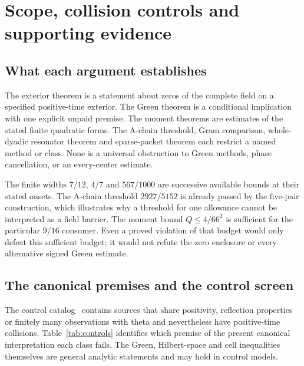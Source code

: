 \section{Scope, collision controls and supporting evidence}\label{sec:evidence}

\subsection{What each argument establishes}

The exterior theorem is a statement about zeros of the complete field
on a specified positive-time exterior. The Green theorem is a conditional
implication with one explicit unpaid premise. The moment theorems are
estimates of the stated finite quadratic forms. The A-chain threshold,
Gram comparison, whole-dyadic resonator theorem and sparse-packet theorem
each restrict a named method or class. None is a universal obstruction
to Green methods, phase cancellation, or an every-center estimate.

The finite widths $7/12$, $4/7$ and $567/1000$ are successive available
bounds at their stated onsets. The A-chain threshold $2927/5152$ is
already passed by the five-pair construction, which illustrates why a
threshold for one allowance cannot be interpreted as a field barrier.
The moment bound $Q\le4/66^2$ is sufficient for the particular $9/16$
consumer. Even a proved violation of that budget would only defeat
this sufficient budget; it would not refute the zero enclosure or
every alternative signed Green estimate.

\subsection{The canonical premises and the control screen}

The control catalog~\cite{RepoControls} contains sources that share
positivity, reflection properties or finitely many observations with
theta and nevertheless have positive-time collisions. Table~\ref{tab:controls}
identifies which premise of the present canonical interpretation each
class fails. The Green, Hilbert-space and cell inequalities themselves
are general analytic statements and may hold in control models.

